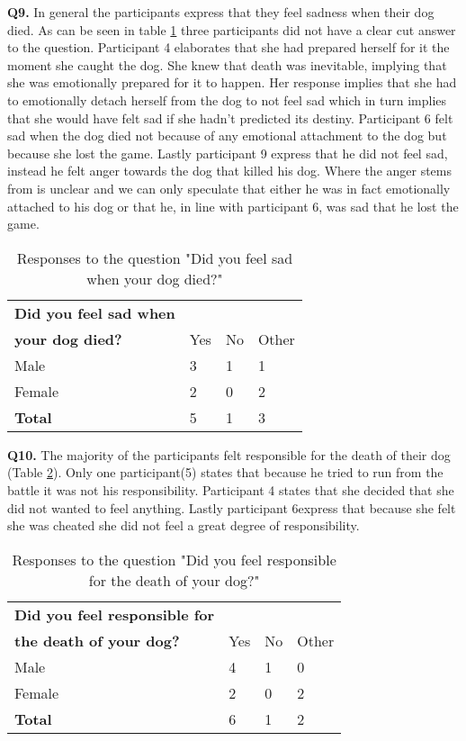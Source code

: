 \textbf{Q9.} In general the participants express that they feel sadness when their dog died. As can be seen in table \ref{tab:sad} three participants did not have a clear cut answer to the question. Participant 4 elaborates that she had prepared herself for it the moment she caught the dog. She knew that death was inevitable, implying that she was emotionally prepared for it to happen. Her response implies that she had to emotionally detach herself from the dog to not feel sad which in turn implies that she would have felt sad if she hadn't predicted its destiny. Participant 6 felt sad when the dog died not because of any emotional attachment to the dog but because she lost the game. Lastly participant 9 express that he did not feel sad, instead he felt anger towards the dog that killed his dog. Where the anger stems from is unclear and we can only speculate that either he was in fact emotionally attached to his dog or that he, in line with participant 6, was sad that he lost the game.

\begin{table}[h]
\centering
\begin{tabular}{l l l l}
\hline
\textbf{Did you feel sad when}\\
\textbf{your dog died?} & Yes & No & Other \\
\hline
Male & 3 & 1 & 1 \\
Female & 2 & 0 & 2 \\
\textbf{Total} & 5 & 1 & 3 \\
\hline
\end{tabular}
\caption{\label{tab:sad}Responses to the question "Did you feel sad when your dog died?"}
\end{table}


\textbf{Q10.} The majority of the participants felt responsible for the death of their dog (Table \ref{tab:death}). Only one participant(5) states that because he tried to run from the battle it was not his responsibility. Participant 4 states that she decided that she did not wanted to feel anything. Lastly participant 6express that because she felt she was cheated she did not feel a great degree of responsibility.

\begin{table}[h]
\centering
\begin{tabular}{l l l l}
\hline
\textbf{Did you feel responsible for}\\
\textbf{the death of your dog?} & Yes & No & Other \\
\hline
Male & 4 & 1 & 0 \\
Female & 2 & 0 & 2 \\
\textbf{Total} & 6 & 1 & 2 \\
\hline
\end{tabular}
\caption{\label{tab:death}Responses to the question "Did you feel responsible for the death of your dog?"}
\end{table}


